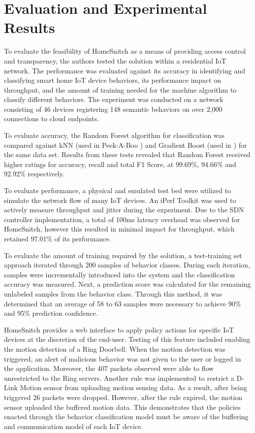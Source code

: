 \section{Evaluation and Experimental Results}

To evaluate the feasibility of HomeSnitch as a means of providing access control and transparency, the authors tested the solution within a residential IoT network. The performance was evaluated against its accuracy in identifying and classifying smart home IoT device behaviors, its performance impact on throughput, and the amount of training needed for the machine algorithm to classify different behaviors. The experiment was conducted on a network consisting of 46 devices registering 148 semantic behaviors on over 2,000 connections to cloud endpoints. 

To evaluate accuracy, the Random Forest algorithm for classification was compared against kNN (used in Peek-A-Boo \cite{Abbas}) and Gradient Boost (used in \cite{six}) for the same data set. Results from these tests revealed that Random Forest received higher ratings for accuracy, recall and total F1 Score, at 99.69\%, 94.66\% and 92.92\% respectively.

To evaluate performance, a physical and emulated test bed were utilized to simulate the network flow of many IoT devices. An iPerf Toolkit was used to actively measure throughput and jitter during the experiment. Due to the SDN controller implementation, a total of 100ms latency overhead was observed for HomeSnitch, however this resulted in minimal impact for throughput, which retained 97.01\% of its performance. 

To evaluate the amount of training required by the solution, a test-training set approach iterated through 200 samples of behavior classes. During each iteration, samples were incrementally introduced into the system and the classification accuracy was measured. Next, a prediction score was calculated for the remaining unlabeled samples from the behavior class. Through this method, it was determined that an average of 58 to 63 samples were necessary to achieve 90\% and 95\% prediction confidence. 

HomeSnitch provides a web interface to apply policy actions for specific IoT devices at the discretion of the end-user. Testing of this feature included enabling the motion detection of a Ring Doorbell. When the motion detection was triggered, an alert of malicious behavior was not given to the user or logged in the application. Moreover, the 407 packets observed were able to flow unrestricted to the Ring servers. Another rule was implemented to restrict a D-Link Motion sensor from uploading motion sensing data. As a result, after being triggered 26 packets were dropped. However, after the rule expired, the motion sensor uploaded the buffered motion data. This demonstrates that the policies enacted through the behavior classification model must be aware of the buffering and communication model of each IoT device. 

